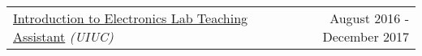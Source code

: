 \documentclass[10pt, letterpaper]{article}
\makeatletter
\newcommand{\headerrow}[2]
{\begin{tabular*}{\linewidth}{l@{\extracolsep{\fill}}r}
	#1 &
	#2 \\
\end{tabular*}}
\makeatother
\begin{document}
\headerrow
	{\uline{Introduction to Electronics Lab Teaching Assistant} \textit{(UIUC)}}
	{August 2016 - December 2017}
	\begin{comment}
	\begin{itemize}
		\item Led basic electronics lab sessions weekly and graded lab reports weekly
	\end{itemize}
	\end{comment}

	\begin{comment}
\headerrow
	{\uline{Introduction to Circuits and Electronics Lecture Assistant} \textit{(UMN)}}
	{January 2016 - May 2016}
	\begin{itemize}
		\item Held weekly office hours to help students learn the basics of circuits and electronics and graded exams
	\end{itemize}
	\end{comment}


		\begin{comment}
\headerrow
	{\uline{Introduction to Digital System Design Lecture Assistant} \textit{(UMN)}}
	{September 2015 - December 2015}
	\begin{itemize}
		\item Held weekly office hours to assit students with learning the basics of digital system design and graded homeworks and exams%
	\end{itemize}
	\end{comment}

		\begin{comment}
\headerrow
	{\uline{Commercial Electrical Engineering Intern} \textit{(The Toro Company)}}
	{May 2015 - August 2015}
	\begin{itemize}
		\item Investigated warranty claims on field-return control boards to determine possible failure modes and the statistics of the failure rates
		\item Designed prototype wireless test platforms, including a GPS and Bluetooth-based asset tracker and a wireless joystick control platform
		\item Investigated the internal components and safety ratings for high-current, three-phase AC motor contorllers for comparison against the various vendor ratings, to provide a final recommendation for use in the fully electric mid-duty Toro Workman
	\end{itemize}
	\end{comment}
\end{document}
